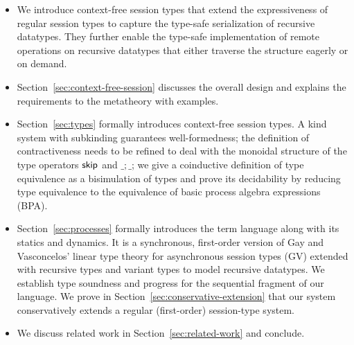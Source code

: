 \begin{itemize}
\item We introduce context-free session types that extend the
  expressiveness of %
  regular
  session types to capture the type-safe serialization of recursive
  datatypes. They further enable the type-safe implementation
  of remote operations on recursive datatypes that either traverse the
  structure eagerly or on demand.
\item Section~\ref{sec:context-free-session} discusses the overall design and explains the
  requirements to the metatheory with examples.
\item Section~\ref{sec:types} formally introduces context-free session types. A kind
  system with subkinding guarantees well-formed\-ness; the definition of contractiveness needs to be
  refined to deal with the monoidal structure of the type operators $\mathsf{skip}$ and $\_;\_$; we give a
  coinductive definition of type equivalence as a bisimulation of types and prove its decidability
  by reducing type equivalence to the equivalence of basic process
  algebra expressions (BPA).
\item Section~\ref{sec:processes} formally introduces the term
  language along with its statics and dynamics. It is a synchronous,
  first-order version of Gay and Vasconcelos' linear type theory for
  asynchronous session types (GV) \cite{DBLP:journals/jfp/GayV10}
  extended with recursive types and variant types to model recursive
  datatypes. We establish type soundness and progress for the
  sequential fragment of our language. We prove in
  Section~\ref{sec:conservative-extension} that our system
  conservatively extends a regular (first-order) session-type system.
\item We discuss related work in Section~\ref{sec:related-work} and conclude.
\end{itemize}

